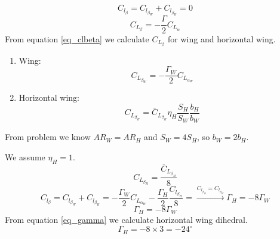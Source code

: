 $$C_{l_\beta} = C_{l_{\beta_W}} + C_{l_{\beta_H}} = 0$$
\begin{equation}
	C_{L_\beta} = -\dfrac{\Gamma}{2}C_{L_\alpha}
	\label{eq_clbeta}
\end{equation}
From equation \ref{eq_clbeta} we calculate $C_{L_\beta}$ for wing and horizontal wing.
\begin{enumerate}
	\item Wing:
	$$C_{L_{\beta_W}} = -\dfrac{\Gamma_W}{2}C_{L_{\alpha_W}}$$
	\item Horizontal wing:
	$$C_{L_{\beta_H}} = \bar C_{L_{\beta_H}} \eta_H \dfrac{S_H}{S_W}\dfrac{b_H}{b_W}$$
\end{enumerate}
From problem we know $AR_W = AR_H$ and $S_W = 4S_H$, so $b_W = 2b_H$.


We assume $\eta_H = 1$.
$$C_{L_{\beta_H}} = \dfrac{\bar C_{L_{\beta_H}}}{8}$$
$$
C_{l_\beta} = C_{l_{\beta_W}} + C_{l_{\beta_H}} = -\dfrac{\Gamma_W}{2}C_{L_{\alpha_W}} 
 -\dfrac{\Gamma_H}{2}\dfrac{C_{l_{\beta_H}}}{8} = \xrightarrow{C_{l_{\beta_H}} = C_{l_{\beta_W}}} \Gamma_H = -8\Gamma_W
$$
\begin{equation}
	\Gamma_H = -8\Gamma_W
	\label{eq_gamma}
\end{equation}
From equation \ref{eq_gamma} we calculate horizontal wing dihedral.
$$\Gamma_H = -8 \times 3 = -24^{\circ}$$
